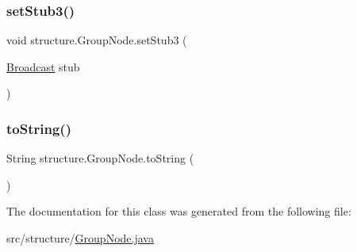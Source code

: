 \mbox{\label{classstructure_1_1_group_node_a8195f402759827e1a5d179fad08a60d8}} 
\subsubsection{\texorpdfstring{set\+Stub3()}{setStub3()}}
{\footnotesize\ttfamily void structure.\+Group\+Node.\+set\+Stub3 (\begin{DoxyParamCaption}\item[{\hyperlink{interfaceserver_1_1_broadcast}{Broadcast}}]{stub }\end{DoxyParamCaption})}

\mbox{\label{classstructure_1_1_group_node_ab0076e02c1b7c6934ee012dfd3fe94e7}} 
\subsubsection{\texorpdfstring{to\+String()}{toString()}}
{\footnotesize\ttfamily String structure.\+Group\+Node.\+to\+String (\begin{DoxyParamCaption}{ }\end{DoxyParamCaption})}



The documentation for this class was generated from the following file\+:\begin{DoxyCompactItemize}
\item 
src/structure/\hyperlink{_group_node_8java}{Group\+Node.\+java}\end{DoxyCompactItemize}
